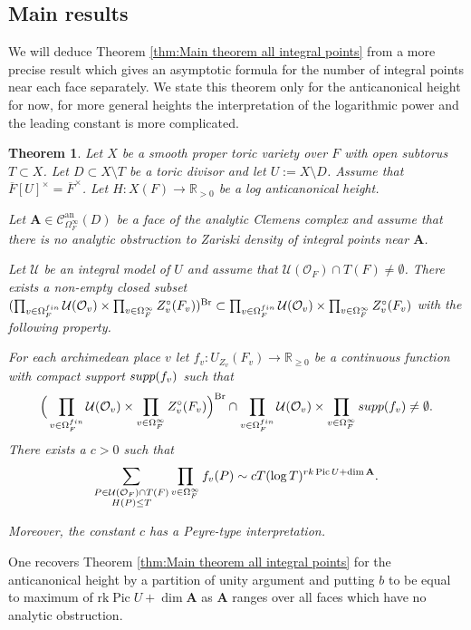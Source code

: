 \documentclass[a4paper,11pt,reqno]{amsart}
\newcommand{\R}{\mathbb{R}}
\DeclareMathOperator{\Pic}{Pic}
\DeclareMathOperator{\Br}{Br}
\DeclareMathOperator{\an}{an}
\newtheorem{theorem}{Theorem}[section]
\theoremstyle{definition}
\begin{document}
\subsection{Main results}
We will deduce Theorem \ref{thm:Main theorem all integral points} from a more precise result which gives an asymptotic formula for the number of integral points near each face separately. We state this theorem only for the anticanonical height for now, for more general heights the interpretation of the logarithmic power and the leading constant is more complicated.
\begin{theorem}\label{thm:Main theorem log anticanonical height}
	Let $X$ be a smooth proper toric variety over $F$ with open subtorus $T \subset X$. Let $D \subset X \setminus T$ be a toric divisor and let $U := X \setminus D$. Assume that $\overline{F}[U]^{\times} = \overline{F}^{\times}$. Let $H: X(F) \to \R_{> 0}$ be a log anticanonical height.
	
	Let $\mathbf{A} \in \mathcal{C}^{\an}_{\Omega_{F}^{\infty}}(D)$ be a face of the analytic Clemens complex and assume that there is no analytic obstruction to Zariski density of integral points near $\mathbf{A}$. 
	
	Let $\mathcal{U}$ be an integral model of $U$ and assume that $\mathcal{U}(\mathcal{O}_F) \cap T(F) \neq \emptyset$. There exists a non-empty closed subset $(\prod_{v \in \Omega_F^{\emph{fin}}} \mathcal{U}(\mathcal{O}_v) \times \prod_{v \in \Omega_F^{\infty}} Z_v^{\circ}(F_v))^{\Br} \subset \prod_{v \in \Omega_F^{\emph{fin}}} \mathcal{U}(\mathcal{O}_v) \times \prod_{v \in \Omega_F^{\infty}} Z_v^{\circ}(F_v)$ with the following property.
	
	For each archimedean place $v$ let $f_v:U_{Z_v}(F_v) \to \R_{\geq 0}$ be a continuous function with compact support $\emph{supp}(f_v)$ such that
	\[
	\Big(\prod_{v \in \Omega_F^{\emph{fin}}} \mathcal{U}(\mathcal{O}_v) \times \prod_{v \in \Omega_F^{\infty}} Z_v^{\circ}(F_v)\Big)^{\Br} \cap \prod_{v \in \Omega_F^{\emph{fin}}} \mathcal{U}(\mathcal{O}_v) \times \prod_{v \in \Omega_F^{\infty}} \emph{supp}(f_v) \neq \emptyset.
	\]
	There exists a $c > 0$ such that
	\[
	\sum_{\substack{P \in \mathcal{U}(\mathcal{O}_F) \cap T(F) \\ H(P) \leq T}} \prod_{v \in \Omega_{F}^{\infty}} f_v(P) \sim c T (\log T)^{\emph{rk} \Pic U + \dim \mathbf{A}}.
	\]
	
	Moreover, the constant $c$ has a Peyre-type interpretation.
\end{theorem}
One recovers Theorem \ref{thm:Main theorem all integral points} for the anticanonical height by a partition of unity argument and putting $b$ to be equal to maximum of $\text{rk} \Pic U + \dim \mathbf{A}$ as $\mathbf{A}$ ranges over all faces which have no analytic obstruction.
\end{document}
